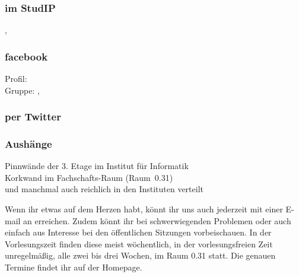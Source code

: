 \subsubsection{im StudIP}
    , 
\subsubsection{facebook}
    Profil:  \\
    Gruppe: ,\\ \phantom{Gruppe:} 
\subsubsection{per Twitter}
\subsubsection{Aushänge}
    Pinnwände der 3. Etage im Institut für Informatik \\
    Korkwand im Fachschafts-Raum (Raum~0.31) \\
    und manchmal auch reichlich in den Instituten verteilt

Wenn ihr etwas auf dem Herzen habt, könnt ihr uns auch jederzeit mit einer E-mail an  erreichen.
Zudem könnt ihr bei schwerwiegenden Problemen oder auch einfach aus Interesse bei den öffentlichen Sitzungen vorbeischauen.
In der Vorlesungszeit finden diese meist wöchentlich, in der vorlesungsfreien Zeit unregelmäßig, alle zwei bis drei Wochen, im Raum 0.31 statt.
Die genauen Termine findet ihr auf der Homepage.


